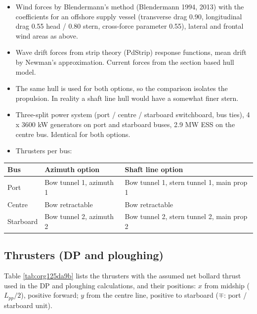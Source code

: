 \documentclass[a4paper,11pt]{article}
\begin{document}
\begin{itemize}
\item Wind forces by Blendermann's method (Blendermann 1994, 2013) with the coefficients
for an offshore supply vessel (transverse drag 0.90, longitudinal drag 0.55 head /
0.80 stern, cross-force parameter 0.55), lateral and frontal wind areas as above.
\item Wave drift forces from strip theory (PdStrip) response functions, mean drift by
Newman's approximation.  Current forces from the section based hull model.
\item The same hull is used for both options, so the comparison isolates the propulsion.
In reality a shaft line hull would have a somewhat finer stern.
\item Three-split power system (port / centre / starboard switchboard, bus ties),
4 x 3600 kW generators on port and starboard buses, 2.9 MW ESS on the centre bus.
Identical for both options.
\item Thrusters per bus:
\end{itemize}

\begin{center}
\begin{tabular}{lll}
\toprule
Bus & Azimuth option & Shaft line option\\[0pt]
\midrule
Port & Bow tunnel 1, azimuth 1 & Bow tunnel 1, stern tunnel 1, main prop 1\\[0pt]
Centre & Bow retractable & Bow retractable\\[0pt]
Starboard & Bow tunnel 2, azimuth 2 & Bow tunnel 2, stern tunnel 2, main prop 2\\[0pt]
\bottomrule
\end{tabular}
\end{center}

\subsection{Thrusters (DP and ploughing)}
\label{sec:org0862940}

Table \ref{tab:org125da9b} lists the thrusters with the assumed net bollard thrust used in
the DP and ploughing calculations, and their positions: \(x\) from midship (\(L_{pp}/2\)),
positive forward; \(y\) from the centre line, positive to starboard (\(\mp\): port / starboard unit).
\end{document}
